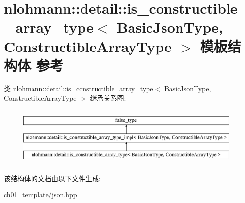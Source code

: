 \hypertarget{structnlohmann_1_1detail_1_1is__constructible__array__type}{}\section{nlohmann\+::detail\+::is\+\_\+constructible\+\_\+array\+\_\+type$<$ Basic\+Json\+Type, Constructible\+Array\+Type $>$ 模板结构体 参考}
\label{structnlohmann_1_1detail_1_1is__constructible__array__type}
类 nlohmann\+::detail\+::is\+\_\+constructible\+\_\+array\+\_\+type$<$ Basic\+Json\+Type, Constructible\+Array\+Type $>$ 继承关系图\+:\begin{figure}[H]
\begin{center}
\leavevmode
\includegraphics[height=3.000000cm]{structnlohmann_1_1detail_1_1is__constructible__array__type}
\end{center}
\end{figure}


该结构体的文档由以下文件生成\+:\begin{DoxyCompactItemize}
\item 
ch01\+\_\+template/json.\+hpp\end{DoxyCompactItemize}
